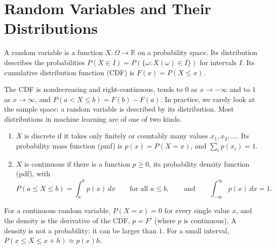 \section{Random Variables and Their Distributions}\label{L4-sec:random-variables}

\begin{definition}\label{L4-def:random-variable}
    A random variable is a function $X: \Omega \to \mathbb{R}$ on a probability space. Its distribution describes the probabilities $P(X \in I) = P(\{\omega : X(\omega) \in I\})$ for intervals $I$. Its cumulative distribution function (CDF) is $F(x) = P(X \leq x)$.
\end{definition}

The CDF is nondecreasing and right-continuous, tends to $0$ as $x \to -\infty$ and to $1$ as $x \to \infty$, and $P(a < X \leq b) = F(b) - F(a)$. In practice, we rarely look at the sample space: a random variable is described by its distribution. Most distributions in machine learning are of one of two kinds.

\begin{definition}\label{L4-def:pmf-pdf}
    \begin{enumerate}
        \item $X$ is discrete if it takes only finitely or countably many values $x_1, x_2, \ldots$. Its probability mass function (pmf) is $p(x) = P(X = x)$, and $\sum_i p(x_i) = 1$.
        \item $X$ is continuous if there is a function $p \geq 0$, its probability density function (pdf), with
        \[P(a \leq X \leq b) = \int_a^b p(x) \, dx \qquad \text{for all } a \leq b, \qquad \text{and} \qquad \int_{-\infty}^\infty p(x) \, dx = 1.\]
    \end{enumerate}
\end{definition}

For a continuous random variable, $P(X = x) = 0$ for every single value $x$, and the density is the derivative of the CDF, $p = F'$ (where $p$ is continuous). A density is not a probability: it can be larger than $1$. For a small interval, $P(x \leq X \leq x + h) \approx p(x)h$.

